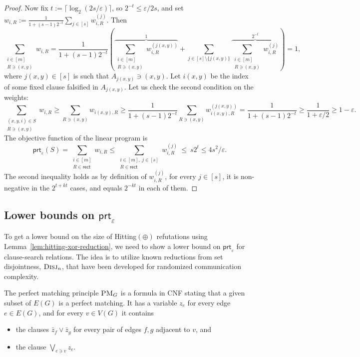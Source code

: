 \documentclass[11pt]{article}
\newcommand{\scterm}[1]{{\textrm{\sc #1}}}
\newcommand{\hit}{\scterm{Hitting}}
\newcommand{\hitp}{{\hit}$(\oplus)$}
\newcommand{\rect}{\mathsf{rect}}
\newcommand{\prt}{\mathsf{prt}}
\newcommand{\disj}{\scterm{Disj}}
\newcommand{\PM}{\scterm{PM}}
\newcommand{\R}{\mathsf{R}}
\numberwithin{equation}{section}
\begin{document}
\begin{proof}
    Now fix $t := \lceil\log_2 (2s/\varepsilon) \rceil$, so $2^{-t} \le \varepsilon/2s$, and set
     $w_{i, R} := \frac{1}{1 + (s-1) 2^{-t}} \sum_{j \in [s]} w^{(j)}_{i, R}$. Then
     \[ \sum_{\substack{i \in [m]\\ R \ni (x,y)}} w_{i,R} = \frac{1}{1 +  (s-1) 2^{-t}} \left(\overbrace{\sum_{\substack{i \in [m]\\ R \ni (x,y)}} w^{(j(x,y))}_{i, R}}^{1} + \sum_{j \in [s] \setminus \{j(x,y)\}} \overbrace{\sum_{\substack{i \in [m]\\ R \ni (x,y)}}  w^{(j)}_{i,R}}^{2^{-t}} \right) = 1,\]
   where $j(x,y) \in [s]$ is such that $A_{j(x,y)} \ni (x,y)$. Let $i(x,y)$ be the index of some fixed clause falsified in $A_{j(x,y)}$. Let us check the second condition on the weights:
   \[ \sum_{\substack{(x, y, i) \in S\\ R \ni (x,y)}} w_{i,R} \ge \!\sum_{R \ni (x,y)} w_{i(x,y), R} \ge \frac{1}{1 +  (s-1) 2^{-t}}  \!\sum_{R \ni (x,y)} w^{(j(x,y))}_{i(x,y), R} = \frac{1}{1 +  (s-1) 2^{-t}} \ge \frac{1}{1+\varepsilon/2} \ge 1-\varepsilon.\]
   The objective function of the linear program is
   \[\prt_\varepsilon (S) = \sum_{\substack{i \in [m]\\ R \in \rect}} w_{i,R} \le \sum_{\substack{i \in [m],\ j \in [s]\\R \in \rect}} w^{(j)}_{i,R} \ \le\! \ s 2^t \le 4 s^2/\varepsilon.\]
   The second inequality holds as by definition of $w^{(j)}_{i,R}$, for every $j\in[s]$, it is non-negative in the $2^{t+kt}$ cases, and equals $2^{-kt}$ in each of them.
\end{proof}

\subsection{Lower bounds on \texorpdfstring{$\prt_\varepsilon$}{prt-eps}}\label{sec:linear-hitting-lb}

To get a lower bound on the size of {\hitp} refutations using Lemma~\ref{lem:hitting-xor-reduction}, we need to show a lower bound on $\prt_\varepsilon$ for clause-search relations. The idea is to utilize known reductions from set disjointness, $\disj_n$, that have been developed for randomized communication complexity.

The perfect matching principle $\PM_G$ is a formula in CNF stating that a given subset of $E(G)$ is a perfect matching. It has a variable $z_e$ for every edge $e\in E(G)$,
and for every $v\in V(G)$ it contains 
\begin{itemize}
\item the clauses $\bar{z}_f\lor\bar{z}_g$ for every pair of edges $f,g$ adjacent to $v$, and
\item the clause $\bigvee_{e\ni v}{z_e}$.
\end{itemize}
\end{document}
